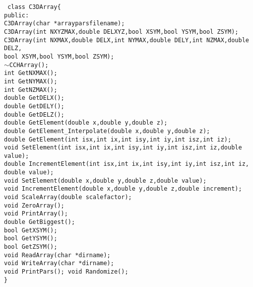 \documentclass[10pt]{article}
\def\tab{\hspace*{9pt}}
\begin{document}
{\tt
class C3DArray\{\\
\tab public:\\
\tab \tab C3DArray(char *arrayparsfilename);\\
\tab \tab C3DArray(int NXYZMAX,double DELXYZ,bool XSYM,bool YSYM,bool ZSYM);\\
\tab \tab C3DArray(int NXMAX,double DELX,int NYMAX,double DELY,int NZMAX,double DELZ,\\
	\tab \tab  bool XSYM,bool YSYM,bool ZSYM);\\
\tab \tab $\sim$CCHArray();\\
\tab \tab int GetNXMAX();\\
\tab \tab int GetNYMAX();\\
\tab \tab int GetNZMAX();\\
\tab \tab double GetDELX();\\
\tab \tab double GetDELY();\\
\tab \tab double GetDELZ();\\
\tab \tab double GetElement(double x,double y,double z);\\
\tab \tab double GetElement\_Interpolate(double x,double y,double z);\\
\tab \tab double GetElement(int isx,int ix,int isy,int iy,int isz,int iz);\\
\tab \tab void SetElement(int isx,int ix,int isy,int iy,int isz,int iz,double value);\\
\tab \tab double IncrementElement(int isx,int ix,int isy,int iy,int isz,int iz,\\
			\tab \tab double value);\\
\tab \tab void SetElement(double x,double y,double z,double value);\\
\tab \tab void IncrementElement(double x,double y,double z,double increment);\\
\tab \tab void ScaleArray(double scalefactor);\\
\tab \tab void ZeroArray();\\
\tab \tab void PrintArray();\\
\tab \tab double GetBiggest();\\
\tab \tab bool GetXSYM();\\
\tab \tab bool GetYSYM();\\
\tab \tab bool GetZSYM();\\
\tab \tab void ReadArray(char *dirname);\\
\tab \tab void WriteArray(char *dirname);\\
\tab \tab void PrintPars();
\tab \tab void Randomize();\\
\}\\
}
\end{document}
